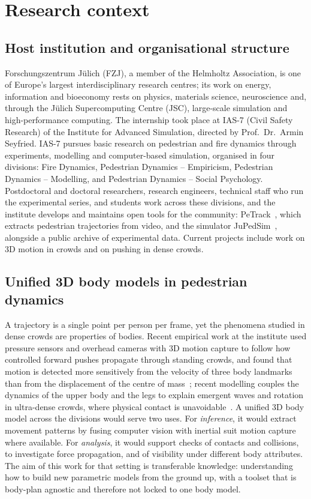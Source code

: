 \section{Research context}
\label{sec:context}

\subsection{Host institution and organisational structure}

Forschungszentrum J\"ulich (FZJ), a member of the Helmholtz Association, is one of
Europe's largest interdisciplinary research centres; its work on energy, information and
bioeconomy rests on physics, materials science, neuroscience and, through the J\"ulich
Supercomputing Centre (JSC), large-scale simulation and high-performance computing. The
internship took place at IAS-7 (Civil Safety Research) of the Institute for Advanced
Simulation, directed by Prof.\ Dr.\ Armin Seyfried. IAS-7 pursues basic research on
pedestrian and fire dynamics through experiments, modelling and computer-based
simulation, organised in four divisions: Fire Dynamics, Pedestrian Dynamics --
Empiricism, Pedestrian Dynamics -- Modelling, and Pedestrian Dynamics -- Social
Psychology. Postdoctoral and doctoral researchers, research engineers, technical staff
who run the experimental series, and students work across these divisions, and the
institute develops and maintains open tools for the community: PeTrack~\cite{petrack},
which extracts pedestrian trajectories from video, and the simulator
JuPedSim~\cite{jupedsim}, alongside a public archive of experimental data. Current
projects include work on 3D motion in crowds and on pushing in dense crowds.

\subsection{Unified 3D body models in pedestrian dynamics}

A trajectory is a single point per person per frame, yet the phenomena studied in dense
crowds are properties of bodies. Recent empirical work at the institute used pressure
sensors and overhead cameras with 3D motion capture to follow how controlled forward
pushes propagate through standing crowds, and found that motion is detected more
sensitively from the velocity of three body landmarks than from the displacement of
the centre of mass~\cite{feldmann}; recent modelling couples the dynamics of the upper
body and the legs to explain emergent waves and rotation in ultra-dense crowds, where
physical contact is unavoidable~\cite{chatagnon}. A unified 3D body model across the
divisions would serve two uses. For \emph{inference}, it would extract movement
patterns by fusing computer vision with inertial suit motion capture where available.
For \emph{analysis}, it would support checks of contacts and collisions, to
investigate force propagation, and of visibility under different body attributes. The
aim of this work for that setting is transferable knowledge: understanding how to
build new parametric models from the ground up, with a toolset that is body-plan
agnostic and therefore not locked to one body model.

